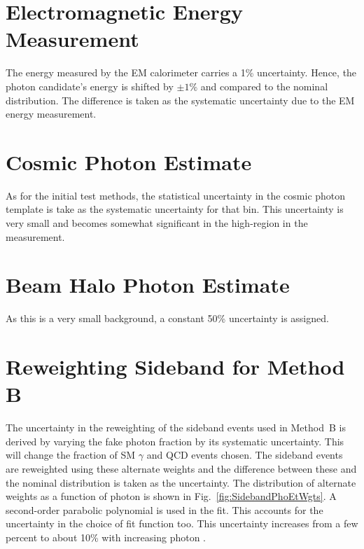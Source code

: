 \section{Electromagnetic Energy Measurement}
The energy measured by the EM calorimeter carries a 1\% uncertainty. Hence, the photon candidate's energy is shifted by $\pm1\%$ and compared to the nominal distribution. The difference is taken as the systematic uncertainty due to the EM energy measurement.

\section{Cosmic Photon Estimate}
As for the initial test methods, the statistical uncertainty in the cosmic photon template is take as the systematic uncertainty for that bin. This uncertainty is very small and becomes somewhat significant in the high-\met region in the \met measurement.

\section{Beam Halo Photon Estimate}
As this is a very small background, a constant 50\% uncertainty is assigned.

\section{Reweighting Sideband for Method B} \label{sec:sidebandRewgtSyst}
The uncertainty in the reweighting of the sideband events used in Method~B is derived by varying the fake photon fraction by its systematic uncertainty. This will change the fraction of SM $\gamma$ and QCD events chosen. The sideband events are reweighted using these alternate weights and the difference between these and the nominal distribution is taken as the uncertainty. The distribution of alternate weights as a function of photon \et is shown in Fig.~\ref{fig:SidebandPhoEtWgts}.
A second-order parabolic polynomial is used in the fit. This accounts for the uncertainty in the choice of fit function too. This uncertainty increases from a few percent to about 10\% with increasing photon \et.

